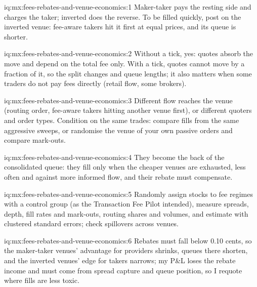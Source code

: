 \begin{solution}{iq:mx:fees-rebates-and-venue-economics:1}
Maker-taker pays the resting side and charges the taker; inverted does the reverse. To be filled quickly, post on the inverted venue: fee-aware takers
hit it first at equal prices, and its queue is shorter.
\end{solution}

\begin{solution}{iq:mx:fees-rebates-and-venue-economics:2}
Without a tick, yes: quotes absorb the move and  depend on the total fee only. With a tick, quotes cannot move by a fraction of it, so
the split changes  and queue lengths; it also matters when some traders do not pay fees directly (retail flow, some brokers).
\end{solution}

\begin{solution}{iq:mx:fees-rebates-and-venue-economics:3}
Different flow reaches the venue (routing order, fee-aware takers hitting another venue first), or different quoters and order types. Condition on the
same trades: compare fills from the same aggressive sweeps, or randomise the venue of your own passive orders and compare mark-outs.
\end{solution}

\begin{solution}{iq:mx:fees-rebates-and-venue-economics:4}
They become the back of the consolidated queue: they fill only when the cheaper venues are exhausted, less often and against more informed flow, and
their rebate must compensate.
\end{solution}

\begin{solution}{iq:mx:fees-rebates-and-venue-economics:5}
Randomly assign stocks to fee regimes with a control group (as the Transaction Fee Pilot intended), measure spreads, depth, fill rates and mark-outs,
routing shares and volumes, and estimate  with clustered standard errors; check spillovers across venues.
\end{solution}

\begin{solution}{iq:mx:fees-rebates-and-venue-economics:6}
Rebates must fall below 0.10 cents, so the maker-taker venues' advantage for providers shrinks, queues there shorten, and the inverted venues' edge for
takers narrows; my P\&L loses the rebate income and must come from spread capture and queue position, so I requote where fills are less toxic.
\end{solution}
